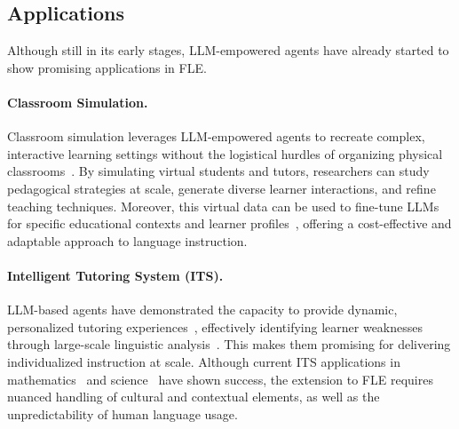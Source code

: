 

\subsection{Applications}
Although still in its early stages, LLM-empowered agents have already started to show promising applications in FLE.


\paragraph{Classroom Simulation.} Classroom simulation leverages LLM-empowered agents to recreate complex, interactive learning settings without the logistical hurdles of organizing physical classrooms~\cite{zhang2024simulating}. By simulating virtual students and tutors, researchers can study pedagogical strategies at scale, generate diverse learner interactions, and refine teaching techniques. Moreover, this virtual data can be used to fine-tune LLMs for specific educational contexts and learner profiles~\cite{liusocraticlm}, offering a cost-effective and adaptable approach to language instruction.

\paragraph{Intelligent Tutoring System (ITS).} LLM-based agents have demonstrated the capacity to provide dynamic, personalized tutoring experiences~\cite{kwon-etal-2024-biped}, effectively identifying learner weaknesses through large-scale linguistic analysis~\cite{caines2023application}. This makes them promising for delivering individualized instruction at scale. Although current ITS applications in mathematics~\cite{pal2024autotutor} and science~\cite{stamper2024enhancing} have shown success, the extension to FLE requires nuanced handling of cultural and contextual elements, as well as the unpredictability of human language usage.

